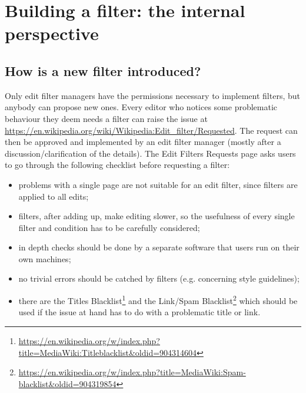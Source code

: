 
\section{Building a filter: the internal perspective}
\subsection{How is a new filter introduced?}

Only edit filter managers have the permissions necessary to implement filters, but anybody can propose new ones.
Every editor who notices some problematic behaviour they deem needs a filter can raise the issue at \url{https://en.wikipedia.org/wiki/Wikipedia:Edit_filter/Requested}.
The request can then be approved and implemented by an edit filter manager (mostly after a discussion/clarification of the details).
The Edit Filters Requests page asks users to go through the following checklist before requesting a filter:
\begin{itemize}
    \item problems with a single page are not suitable for an edit filter, since filters are applied to all edits;
    \item filters, after adding up, make editing slower, so the usefulness of every single filter and condition has to be carefully considered;
    \item in depth checks should be done by a separate software that users run on their own machines;
    \item no trivial errors should be catched by filters (e.g. concerning style guidelines);
    \item there are the Titles Blacklist\footnote{\url{https://en.wikipedia.org/w/index.php?title=MediaWiki:Titleblacklist&oldid=904314604}} and the Link/Spam Blacklist\footnote{\url{https://en.wikipedia.org/w/index.php?title=MediaWiki:Spam-blacklist&oldid=904319854}} which should be used if the issue at hand has to do with a problematic title or link.
\end{itemize}

